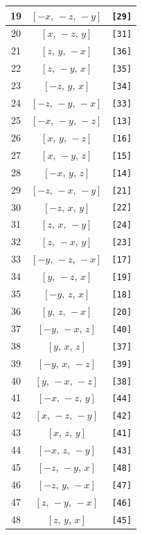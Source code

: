 \documentclass[fleqn,8pt]{jsarticle}
\begin{document}
\begin{longtable}{ccc}
19 & $\left[ - x,\, - z,\, - y \right]$ & {\tt [29]} \\ \hline
20 & $\left[ x,\, - z,\, y \right]$ & {\tt [31]} \\ \hline
21 & $\left[ z,\, y,\, - x \right]$ & {\tt [36]} \\ \hline
22 & $\left[ z,\, - y,\, x \right]$ & {\tt [35]} \\ \hline
23 & $\left[ - z,\, y,\, x \right]$ & {\tt [34]} \\ \hline
24 & $\left[ - z,\, - y,\, - x \right]$ & {\tt [33]} \\ \hline
25 & $\left[ - x,\, - y,\, - z \right]$ & {\tt [13]} \\ \hline
26 & $\left[ x,\, y,\, - z \right]$ & {\tt [16]} \\ \hline
27 & $\left[ x,\, - y,\, z \right]$ & {\tt [15]} \\ \hline
28 & $\left[ - x,\, y,\, z \right]$ & {\tt [14]} \\ \hline
29 & $\left[ - z,\, - x,\, - y \right]$ & {\tt [21]} \\ \hline
30 & $\left[ - z,\, x,\, y \right]$ & {\tt [22]} \\ \hline
31 & $\left[ z,\, x,\, - y \right]$ & {\tt [24]} \\ \hline
32 & $\left[ z,\, - x,\, y \right]$ & {\tt [23]} \\ \hline
33 & $\left[ - y,\, - z,\, - x \right]$ & {\tt [17]} \\ \hline
34 & $\left[ y,\, - z,\, x \right]$ & {\tt [19]} \\ \hline
35 & $\left[ - y,\, z,\, x \right]$ & {\tt [18]} \\ \hline
36 & $\left[ y,\, z,\, - x \right]$ & {\tt [20]} \\ \hline
37 & $\left[ - y,\, - x,\, z \right]$ & {\tt [40]} \\ \hline
38 & $\left[ y,\, x,\, z \right]$ & {\tt [37]} \\ \hline
39 & $\left[ - y,\, x,\, - z \right]$ & {\tt [39]} \\ \hline
40 & $\left[ y,\, - x,\, - z \right]$ & {\tt [38]} \\ \hline
41 & $\left[ - x,\, - z,\, y \right]$ & {\tt [44]} \\ \hline
42 & $\left[ x,\, - z,\, - y \right]$ & {\tt [42]} \\ \hline
43 & $\left[ x,\, z,\, y \right]$ & {\tt [41]} \\ \hline
44 & $\left[ - x,\, z,\, - y \right]$ & {\tt [43]} \\ \hline
45 & $\left[ - z,\, - y,\, x \right]$ & {\tt [48]} \\ \hline
46 & $\left[ - z,\, y,\, - x \right]$ & {\tt [47]} \\ \hline
47 & $\left[ z,\, - y,\, - x \right]$ & {\tt [46]} \\ \hline
48 & $\left[ z,\, y,\, x \right]$ & {\tt [45]} \\
\end{longtable}
\end{document}
